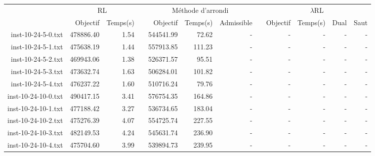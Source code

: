 \begin{landscape}

\begin{table}[h!]\centering
{}
\begin{tabular}{@{}rrrcrrrcrrrr@{}}\toprule
& \multicolumn{2}{c}{RL} & \phantom{abc} & \multicolumn{3}{c}{Méthode d'arrondi} & \phantom{abc} & \multicolumn{4}{c}{$\lambda$RL}\\
\cmidrule{2-3} \cmidrule{5-7} \cmidrule{9-12}
& Objectif & Temps(s) & & Objectif & Temps(s) & Admissible & & Objectif & Temps(s) & Dual & Saut\\ \midrule

inst-10-24-5-0.txt & 478886.40 & 1.54 & & 544541.99 & 72.62 & - & & - & - & - & - \\
inst-10-24-5-1.txt & 475638.19 & 1.44 & & 557913.85 & 111.23 & - & & - & - & - & - \\
inst-10-24-5-2.txt & 469943.06 & 1.38 & & 526371.57 & 95.51 & - & & - & - & - & - \\
inst-10-24-5-3.txt & 473632.74 & 1.63 & & 506284.01 & 101.82 & - & & - & - & - & - \\
inst-10-24-5-4.txt & 476237.22 & 1.60 & & 510716.24 & 79.76 & - & & - & - & - & - \\
inst-10-24-10-0.txt & 490417.15 & 3.41 & & 576754.35 & 164.86 & - & & - & - & - & - \\
inst-10-24-10-1.txt & 477188.42 & 3.27 & & 536734.65 & 183.04 & - & & - & - & - & - \\
inst-10-24-10-2.txt & 475276.39 & 4.07 & & 554725.74 & 227.55 & - & & - & - & - & - \\
inst-10-24-10-3.txt & 482149.53 & 4.24 & & 545631.74 & 236.90 & - & & - & - & - & - \\
inst-10-24-10-4.txt & 475704.60 & 3.99 & & 539894.73 & 239.95 & - & & - & - & - & - \\

\end{tabular}
\end{table}

\end{landscape}